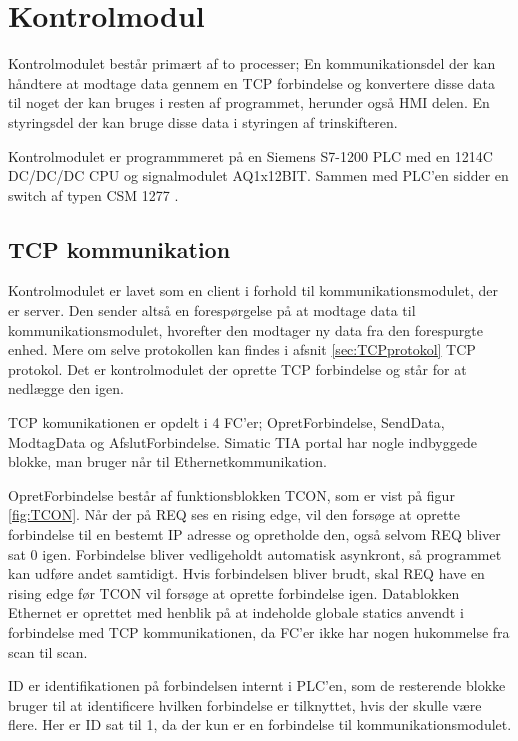 
\section{Kontrolmodul}
Kontrolmodulet består primært af to processer; En kommunikationsdel der kan håndtere at modtage data gennem en TCP forbindelse og konvertere disse data til noget der kan bruges i resten af programmet, herunder også HMI delen. En styringsdel der kan bruge disse data i styringen af trinskifteren.

Kontrolmodulet er programmmeret på en Siemens S7-1200 PLC med en 1214C DC/DC/DC CPU og signalmodulet AQ1x12BIT. Sammen med PLC'en sidder en switch af typen CSM 1277 .


\subsection{TCP kommunikation}
\label{sec:TCPkommunikation}
Kontrolmodulet er lavet som en client i forhold til kommunikationsmodulet, der er server. Den sender altså en forespørgelse på at modtage data til kommunikationsmodulet, hvorefter den modtager ny data fra den forespurgte enhed. Mere om selve protokollen kan findes i afsnit \ref{sec:TCPprotokol} TCP protokol. Det er kontrolmodulet der oprette TCP forbindelse og står for at nedlægge den igen.

TCP komunikationen er opdelt i 4 FC'er; OpretForbindelse, SendData, ModtagData og AfslutForbindelse. Simatic TIA portal har nogle indbyggede blokke, man bruger når til Ethernetkommunikation.

OpretForbindelse består af funktionsblokken TCON, som er vist på figur \ref{fig:TCON}. Når der på REQ ses en rising edge, vil den forsøge at oprette forbindelse til en bestemt IP adresse og opretholde den, også selvom REQ bliver sat 0 igen. Forbindelse bliver vedligeholdt automatisk asynkront, så programmet kan udføre andet samtidigt. Hvis forbindelsen bliver brudt, skal REQ have en rising edge før TCON vil forsøge at oprette forbindelse igen. Datablokken Ethernet er oprettet med henblik på at indeholde globale statics anvendt i forbindelse med TCP kommunikationen, da FC'er ikke har nogen hukommelse fra scan til scan.

ID er identifikationen på forbindelsen internt i PLC'en, som de resterende blokke bruger til at identificere hvilken forbindelse er tilknyttet, hvis der skulle være flere. Her er ID sat til 1, da der kun er en forbindelse til kommunikationsmodulet.

